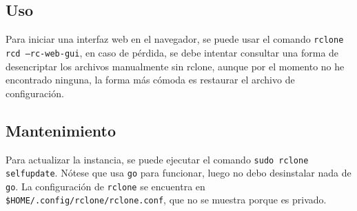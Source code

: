     \inputminted[breaklines, breakanywhere, breaksymbolleft="", breaksymbolright="", breakanywheresymbolpre="", breakanywheresymbolpost=""]
    {systemd}{inc/crontab}

    \subsection{Uso}
    Para iniciar una interfaz web en el navegador, se puede usar el comando \texttt{rclone rcd --rc-web-gui}, en caso de pérdida, se debe intentar consultar una forma de desencriptar los archivos manualmente sin rclone, aunque por el momento no he encontrado ninguna, la forma más cómoda es restaurar el archivo de configuración.

    \subsection{Mantenimiento}
    Para actualizar la instancia, se puede ejecutar el comando \texttt{sudo rclone selfupdate}. Nótese que usa \texttt{go} para funcionar, luego no debo desinstalar nada de \texttt{go}. La configuración de \texttt{rclone} se encuentra en \texttt{\$HOME/.config/rclone/rclone.conf},
    que no se muestra porque es privado.

